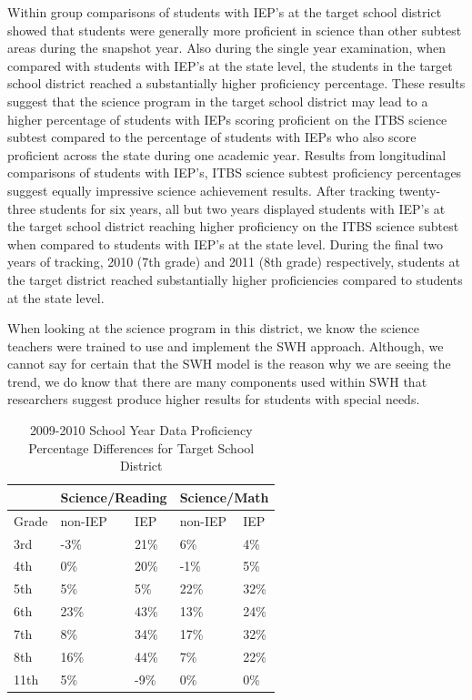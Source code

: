 \documentclass[11.5pt]{sig-alternate} %
\begin{document}
\begin{large}
Within group comparisons of students with IEP’s at the target school district showed that students were generally more proficient in science than other subtest areas during the snapshot year. Also during the single year examination, when compared with students with IEP’s at the state level, the students in the target school district reached a substantially higher proficiency percentage. These results suggest that the science program in the target school district may lead to a higher percentage of students with IEPs scoring proficient on the ITBS science subtest compared to the percentage of students with IEPs who also score proficient across the state during one academic year. Results from longitudinal comparisons of students with IEP’s, ITBS science subtest proficiency percentages suggest equally impressive science achievement results. After tracking twenty-three students for six years, all but two years displayed students with IEP’s at the target school district reaching higher proficiency on the ITBS science subtest when compared to students with IEP’s at the state level. During the final two years of tracking, 2010 (7th grade) and 2011 (8th grade) respectively, students at the target district reached substantially higher proficiencies compared to students at the state level.

When looking at the science program in this district, we know the science teachers were trained to use and implement the SWH approach. Although, we cannot say for certain that the SWH model is the reason why we are seeing the trend, we do know that there are many components used within SWH that researchers suggest produce higher results for students with special needs.

\begin{table}[tph]
\caption{2009-2010 School Year Data Proficiency Percentage Differences for Target School District}
\begin{tabular}{lllll}
\hline
 & \multicolumn{2}{l}{Science/Reading} & \multicolumn{2}{l}{Science/Math} \\ \hline
Grade & non-IEP & IEP & non-IEP & IEP \\ \hline
3rd & -3\% & 21\% & 6\% & 4\% \\
4th & 0\% & 20\% & -1\% & 5\% \\
5th & 5\% & 5\% & 22\% & 32\% \\
6th & 23\% & 43\% & 13\% & 24\% \\
7th & 8\% & 34\% & 17\% & 32\% \\
8th & 16\% & 44\% & 7\% & 22\% \\
11th & 5\% & -9\% & 0\% & 0\% \\ \hline
\end{tabular}
\end{table}


\end{large}
\end{document}
